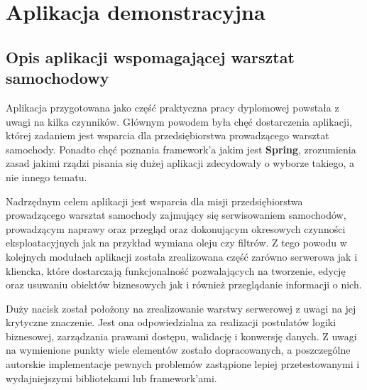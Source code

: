 \chapter{Aplikacja demonstracyjna}
\label{chapter:app}

\section{Opis aplikacji wspomagającej warsztat samochodowy}

	Aplikacja przygotowana jako część praktyczna pracy dyplomowej powstała z uwagi na kilka
	czynników. Głównym powodem była chęć dostarczenia aplikacji, której zadaniem jest wsparcia
	dla przedsiębiorstwa prowadzącego warsztat samochody. Ponadto chęć poznania framework'a jakim
	jest \textbf{Spring}, zrozumienia zasad jakimi rządzi pisania się dużej aplikacji zdecydowały
	o wyborze takiego, a nie innego tematu. 
	
	Nadrzędnym celem aplikacji jest wsparcia dla misji przedsiębiorstwa prowadzącego warsztat
	samochody zajmujący się serwisowaniem samochodów, prowadzącym naprawy oraz przegląd oraz
	dokonującym okresowych czynności eksploatacyjnych jak na przykład wymiana oleju czy filtrów.
	Z tego powodu w kolejnych modułach aplikacji została zrealizowana część zarówno serwerowa jak i 
	kliencka, które dostarczają funkcjonalność pozwalających na tworzenie, edycję oraz usuwaniu 
	obiektów biznesowych jak i również przeglądanie informacji o nich.

	Duży nacisk został położony na zrealizowanie warstwy serwerowej z uwagi na jej krytyczne znaczenie.
	Jest ona odpowiedzialna za realizacji postulatów logiki biznesowej, zarządzania prawami dostępu,
	walidację i konwersję danych. Z uwagi na wymienione punkty wiele elementów zostało dopracowanych, a 
	poszczególne autorskie implementacje pewnych problemów zastąpione lepiej przetestowanymi i wydajniejszymi
	bibliotekami lub framework'ami. 
		
